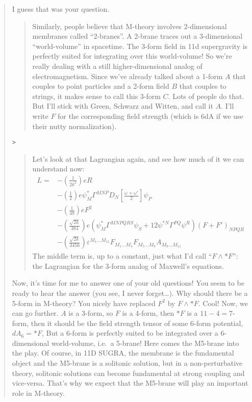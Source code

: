 \documentclass{article}
\begin{document}
\begin{quote}
I guess that was your question.

\begin{quote}
Similarly, people believe that M-theory involves 2-dimensional membranes
called ``2-branes''. A 2-brane traces out a 3-dimensional
``world-volume'' in spacetime. The 3-form field in 11d supergravity is
perfectly suited for integrating over this world-volume! So we're really
dealing with a still higher-dimensional analog of electromagnetism.
Since we've already talked about a 1-form \(A\) that couples to point
particles and a 2-form field \(B\) that couples to strings, it makes
sense to call this 3-form \(C\). Lots of people do that. But I'll stick
with Green, Schwarz and Witten, and call it \(A\). I'll write \(F\) for
the corresponding field strength (which is 6dA if we use their nutty
normalization).
\end{quote}

\begin{verbatim}
>
\end{verbatim}

\begin{quote}
Let's look at that Lagrangian again, and see how much of it we can
understand now: \[
  \begin{aligned}
    L =
    &- \left(\frac{1}{2k^2}\right) eR
  \\&- \left(\frac{1}{2}\right) e\psi_M^* \Gamma^{MNP} D_N\left[\frac{\omega+\omega'}{2}\right]\psi_P
  \\&- \left(\frac{1}{48}\right) eF^2
  \\&- \left(\frac{\sqrt{2k}}{384}\right) e(\psi_M^* \Gamma^{MNPQRS}\psi_S + 12\psi^{*N}\Gamma^{PQ}\psi^R)(F+F')_{NPQR}
  \\&- \left(\frac{\sqrt{2k}}{3456}\right) \varepsilon^{M_1\ldots M_{11}}F_{M_1\ldots M_4}F_{M_5\ldots M_8}A_{M_9\ldots M_{11}}
  \end{aligned}
\] The middle term is, up to a constant, just what I'd call
``\(F\wedge *F\)'': the Lagrangian for the 3-form analog of Maxwell's
equations.
\end{quote}

Now, it's time for me to answer one of your old questions! You seem to
be ready to hear the answer (you see, I never forget\ldots). Why should
there be a 5-form in M-theory? You nicely have replaced \(F^2\) by
\(F\wedge*F\). Cool! Now, we can go further. \(A\) is a 3-form, so \(F\)
is a 4-form, then \(*F\) is a \(11-4=7\)-form, then it should be the
field strength tensor of some 6-form potential, \(dA_6=*F\), But a
6-form is perfectly suited to be integrated over a 6-dimensional
world-volume, i.e.~a 5-brane! Here comes the M5-brane into the play. Of
course, in 11D SUGRA, the membrane is the fundamental object and the
M5-brane is a solitonic solution, but in a non-perturbative theory,
solitonic solutions can become fundamental at strong coupling and
vice-versa. That's why we expect that the M5-brane will play an
important role in M-theory.


\end{quote}
\end{document}
